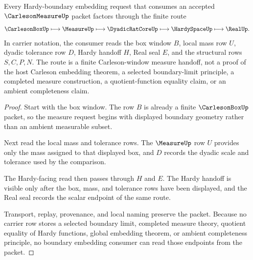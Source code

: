 \begin{theorem}
\label{thm:carleson-measure-window-embedding-handoff}
Every Hardy-boundary embedding request that consumes an accepted $\CarlesonMeasureUp$ packet factors through the finite route
$$
\CarlesonBoxUp \longmapsto \MeasureUp \longmapsto \DyadicRatCoreUp \longmapsto \HardySpaceUp \longmapsto \RealUp .
$$
In carrier notation, the consumer reads the box window $B$, local mass row $U$, dyadic tolerance row $D$, Hardy handoff $H$, Real seal $E$, and the structural rows $S,C,P,N$. The route is a finite Carleson-window measure handoff, not a proof of the host Carleson embedding theorem, a selected boundary-limit principle, a completed measure construction, a quotient-function equality claim, or an ambient completeness claim.
\end{theorem}
\begin{proof}
Start with the box window. The row $B$ is already a finite $\CarlesonBoxUp$ packet, so the measure request begins with displayed boundary geometry rather than an ambient measurable subset.

Next read the local mass and tolerance rows. The $\MeasureUp$ row $U$ provides only the mass assigned to that displayed box, and $D$ records the dyadic scale and tolerance used by the comparison.

The Hardy-facing read then passes through $H$ and $E$. The Hardy handoff is visible only after the box, mass, and tolerance rows have been displayed, and the Real seal records the scalar endpoint of the same route.

Transport, replay, provenance, and local naming preserve the packet. Because no carrier row stores a selected boundary limit, completed measure theory, quotient equality of Hardy functions, global embedding theorem, or ambient completeness principle, no boundary embedding consumer can read those endpoints from the packet.
\end{proof}



